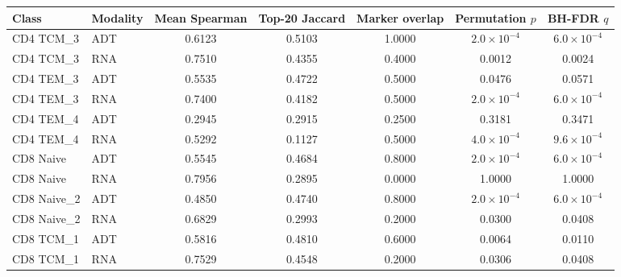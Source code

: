\begin{tabular}{llccc@{\hspace{1.5em}}c@{\hspace{1.5em}}c}
\toprule
Class & Modality & Mean Spearman & Top-20 Jaccard & Marker overlap & Permutation $p$ & BH-FDR $q$ \\
\midrule
CD4 TCM\_3 & ADT & 0.6123 & 0.5103 & 1.0000 & $2.0\times10^{-4}$ & $6.0\times10^{-4}$ \\
CD4 TCM\_3 & RNA & 0.7510 & 0.4355 & 0.4000 & 0.0012 & 0.0024 \\
CD4 TEM\_3 & ADT & 0.5535 & 0.4722 & 0.5000 & 0.0476 & 0.0571 \\
CD4 TEM\_3 & RNA & 0.7400 & 0.4182 & 0.5000 & $2.0\times10^{-4}$ & $6.0\times10^{-4}$ \\
CD4 TEM\_4 & ADT & 0.2945 & 0.2915 & 0.2500 & 0.3181 & 0.3471 \\
CD4 TEM\_4 & RNA & 0.5292 & 0.1127 & 0.5000 & $4.0\times10^{-4}$ & $9.6\times10^{-4}$ \\
CD8 Naive & ADT & 0.5545 & 0.4684 & 0.8000 & $2.0\times10^{-4}$ & $6.0\times10^{-4}$ \\
CD8 Naive & RNA & 0.7956 & 0.2895 & 0.0000 & 1.0000 & 1.0000 \\
CD8 Naive\_2 & ADT & 0.4850 & 0.4740 & 0.8000 & $2.0\times10^{-4}$ & $6.0\times10^{-4}$ \\
CD8 Naive\_2 & RNA & 0.6829 & 0.2993 & 0.2000 & 0.0300 & 0.0408 \\
CD8 TCM\_1 & ADT & 0.5816 & 0.4810 & 0.6000 & 0.0064 & 0.0110 \\
CD8 TCM\_1 & RNA & 0.7529 & 0.4548 & 0.2000 & 0.0306 & 0.0408 \\
\bottomrule
\end{tabular}
